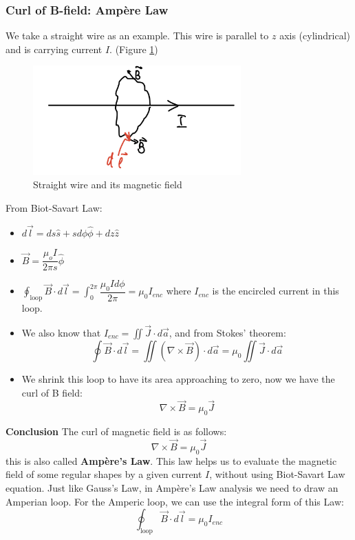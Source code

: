 \documentclass[12pt,a4paper,twoside]{article}
\numberwithin{equation}{section}
\begin{document}
\subsubsection{Curl of B-field: Amp\`ere Law}
We take a straight wire as an example. This wire is parallel to $z$ axis (cylindrical) and is carrying current $I$. (Figure \ref{fig: curl-B})
\begin{figure}[h]
    \centering
    \includegraphics[width=8cm]{250-Revision/curl-b.PNG}
    \caption{Straight wire and its magnetic field}
    \label{fig: curl-B}
\end{figure}
\newline
\noindent From Biot-Savart Law:
\begin{itemize}
    \item $d\overrightarrow{l}=ds\hat{s}+sd\phi\hat{\phi}+dz\hat{z}$
    \item $\overrightarrow{B}=\dfrac{\mu_oI}{2\pi s}\hat{\phi}$
    \item $\oint_{\mathrm{loop}}\overrightarrow{B}\cdot d\overrightarrow{l}=\int_{0}^{2\pi}\dfrac{\mu_0Id\phi}{2\pi}=\mu_0I_{enc}$
    where $I_{enc}$ is the encircled current in this loop.
    \item We also know that $I_{enc}=\iint \overrightarrow{J}\cdot d\overrightarrow{a}$, and from Stokes' theorem:
    \[\oint\overrightarrow{B}\cdot d\overrightarrow{l}=\iint(\nabla \times \overrightarrow{B})\cdot d\overrightarrow{a}=\mu_0\iint \overrightarrow{J}\cdot d\overrightarrow{a}\]
    \item We shrink this loop to have its area approaching to zero, now we have the curl of B field:
    \[\nabla\times \overrightarrow{B}=\mu_0\overrightarrow{J}\]
\end{itemize}

\noindent\textbf{Conclusion} The curl of magnetic field is as follows:
\begin{equation}
    \boxed{
    \nabla\times \overrightarrow{B}=\mu_0\overrightarrow{J}
    }
    \label{eq: Ampere-law}
\end{equation}
this is also called \textbf{Amp\`ere's Law}. This law helps us to evaluate the magnetic field of some regular shapes by a given current $I$, without using Biot-Savart Law equation. Just like Gauss's Law, in Amp\`ere's Law analysis we need to draw an Amperian loop. For the Amperic loop, we can use the integral form of this Law:
\begin{equation}
    \boxed{
    \oint_{\mathrm{loop}}\overrightarrow{B}\cdot d\overrightarrow{l}=\mu_0I_{enc}
    }
    \label{eq: Ampere-law-integral}
\end{equation}
\end{document}
